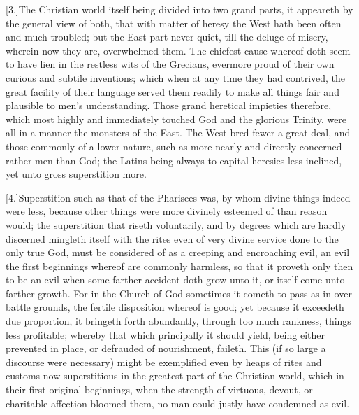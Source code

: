 [3.]The Christian world itself being divided into two grand parts, it appeareth by the general view of both, that with matter of heresy the West hath been often and much troubled; but the East part never quiet, till the deluge of misery, wherein now they are, overwhelmed them. The chiefest cause whereof doth seem to have lien in the restless wits of the Grecians, evermore proud of their own curious and subtile inventions; which when at any time they had contrived, the great facility of their language served them readily to make all things fair and plausible to men’s understanding. Those grand heretical impieties therefore, which most highly and immediately touched God and the glorious Trinity, were all in a manner the monsters of the East. The West bred fewer a great deal, and those commonly of a lower nature, such as more nearly and directly concerned rather men than God; the Latins being always to capital heresies less inclined, yet unto gross superstition more.

[4.]Superstition such as that of the Pharisees was, by whom divine things indeed were less, because other things were more divinely esteemed of than reason would; the superstition that riseth voluntarily, and by degrees which are hardly discerned mingleth itself with the rites even of very divine service done to the only true God, must be considered of as a creeping and encroaching evil, an evil the first beginnings whereof are commonly harmless, so that it proveth only then to be an evil when some farther accident doth grow unto it, or itself come unto farther growth. For in the Church of God sometimes it cometh to pass as in over battle grounds, the fertile disposition whereof is good; yet because it exceedeth due proportion, it bringeth forth abundantly, through too much rankness, things less profitable; whereby that which principally it should yield, being either prevented in place, or defrauded of nourishment, faileth. This (if so large a discourse were necessary) might be exemplified even by heaps of rites and customs now superstitious in the greatest part of the Christian world, which in their first original beginnings, when the strength of virtuous,  devout, or charitable affection bloomed them, no man could justly have condemned as evil.


